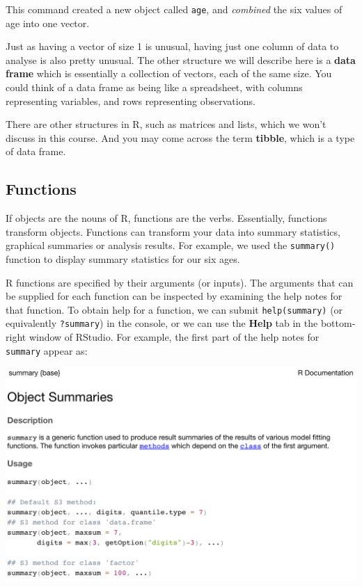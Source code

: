 \documentclass[
]{memoir}
\begin{document}
This command created a new object called \texttt{age}, and \emph{combined} the six values of age into one vector.

Just as having a vector of size 1 is unusual, having just one column of data to analyse is also pretty unusual. The other structure we will describe here is a \textbf{data frame} which is essentially a collection of vectors, each of the same size. You could think of a data frame as being like a spreadsheet, with columns representing variables, and rows representing observations.

There are other structures in R, such as matrices and lists, which we won't discuss in this course. And you may come across the term \textbf{tibble}, which is a type of data frame.

\hypertarget{functions}{%
\subsection{Functions}\label{functions}}

If objects are the nouns of R, functions are the verbs. Essentially, functions transform objects. Functions can transform your data into summary statistics, graphical summaries or analysis results. For example, we used the \texttt{summary()} function to display summary statistics for our six ages.

R functions are specified by their arguments (or inputs). The arguments that can be supplied for each function can be inspected by examining the help notes for that function. To obtain help for a function, we can submit \texttt{help(summary)} (or equivalently \texttt{?summary}) in the console, or we can use the \textbf{Help} tab in the bottom-right window of RStudio. For example, the first part of the help notes for \texttt{summary} appear as:

\includegraphics[width=0.8\linewidth]{img/help-1}
\end{document}
